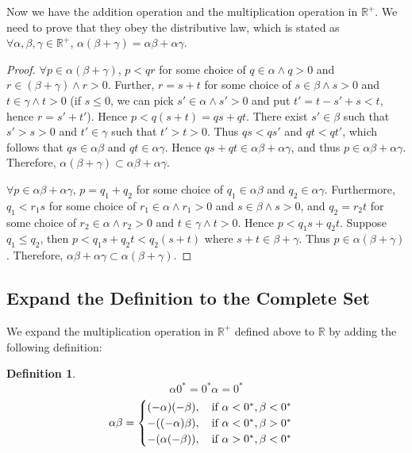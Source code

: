 \documentclass[onecolumn]{article}
\newtheorem{definition}{Definition}[section]
\begin{document}
Now we have the addition operation and the multiplication operation in 
$\mathbb{R^+}$. We need to prove that they obey the distributive law, which is 
stated as $\forall \alpha, \beta, \gamma \in \mathbb{R^+}$, 
$\alpha (\beta + \gamma) = \alpha \beta + \alpha \gamma$.
\begin{proof}
  $\forall p \in \alpha (\beta + \gamma)$, $p < qr$ for some choice of 
  $q \in \alpha \wedge q > 0$ and $r \in (\beta + \gamma) \wedge r > 0$. 
  Further, $r = s + t$ for some choice of $s \in \beta \wedge s > 0$ and 
  $t \in \gamma \wedge t > 0$ (if $s \leq 0$, we can pick 
  $s' \in \alpha \wedge s' > 0$ and put $t' = t - s' + s < t$, hence 
  $r = s' + t'$). Hence $p < q (s + t) = qs + qt$. There exist $s' \in \beta$ 
  such that $s' > s > 0$ and $t' \in \gamma$ such that $t' > t > 0$. Thus 
  $qs < qs'$ and $qt < qt'$, which follows that $qs \in \alpha \beta$ and 
  $qt \in \alpha \gamma$. Hence $qs + qt \in \alpha \beta + \alpha \gamma$, and 
  thus $p \in \alpha \beta + \alpha \gamma$. Therefore, 
  $\alpha (\beta + \gamma) \subset \alpha \beta + \alpha \gamma$.

  $\forall p \in \alpha \beta + \alpha \gamma$, $p = q_1 + q_2$ for some choice 
  of $q_1 \in \alpha \beta$ and $q_2 \in \alpha \gamma$. Furthermore, 
  $q_1 < r_1 s$ for some choice of $r_1 \in \alpha \wedge r_1 > 0$ and 
  $s \in \beta \wedge s > 0$, and $q_2 = r_2 t$ for some choice of 
  $r_2 \in \alpha \wedge r_2 > 0$ and $t \in \gamma \wedge t > 0$. Hence 
  $p < q_1 s + q_2 t$. Suppose $q_1 \leq q_2$, then 
  $p < q_1 s + q_2 t < q_2 (s + t)$ where $s + t \in \beta + \gamma$. Thus 
  $p \in \alpha (\beta + \gamma)$. Therefore, 
  $\alpha \beta + \alpha \gamma \subset \alpha (\beta + \gamma)$.
\end{proof}

\subsection{Expand the Definition to the Complete Set}

We expand the multiplication operation in $\mathbb{R^+}$ defined above to 
$\mathbb{R}$ by adding the following definition:
\begin{definition}
  \[
    \alpha 0^* = 0^* \alpha = 0^*
  \]
  \[
    \alpha \beta = 
    \begin{cases}
      (-\alpha)(-\beta), \quad \textnormal{if } \alpha < 0^*, \beta < 0^* \\
      -((-\alpha)\beta), \quad \textnormal{if } \alpha < 0^*, \beta > 0^* \\
      -(\alpha(-\beta)), \quad \textnormal{if } \alpha > 0^*, \beta < 0^*       
    \end{cases}
  \]
\end{definition}
\end{document}
